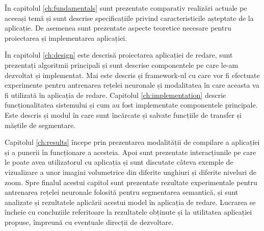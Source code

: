 În capitolul \ref{ch:fundamentals} sunt prezentate comparativ realizări actuale pe aceeași temă și sunt descrise specificațiile privind caracteristicile așteptate de la aplicație. De asemenea sunt prezentate aspecte teoretice necesare pentru proiectarea și implementarea aplicației.

În capitolul \ref{ch:design} este descrisă proiectarea aplicației de redare, sunt prezentați algoritmii principali și sunt descrise componentele pe care le-am dezvoltat și implementat. Mai este descris și framework-ul cu care vor fi efectuate experimente pentru antrenarea rețelei neuronale și modalitatea în care aceasta va fi utilizată în aplicația de redare.
Capitolul \ref{ch:implementation} descrie funcționalitatea sistemului și cum au fost implementate componentele principale. Este descris și modul în care sunt încărcate și salvate funcțiile de transfer și măștile de segmentare.

Capitolul \ref{ch:results} începe prin prezentarea modalității de compilare a aplicației și a punerii în funcționare a acesteia. Apoi sunt prezentate interacțiunile pe care le poate avea utilizatorul cu aplicația și sunt discutate câteva exemple de vizualizare a unor imagini volumetrice din diferite unghiuri și diferite niveluri de zoom. Spre finalul acestui capitol sunt prezentate rezultate experimentale pentru antrenarea rețelei neuronale folosită pentru segmentarea semantică, și sunt analizate și rezultatele aplicării acestui model în aplicația de redare.
Lucrarea se încheie cu concluziile referitoare la rezultatele obținute și la utilitatea aplicației propuse, împreună cu eventuale direcții de dezvoltare.
